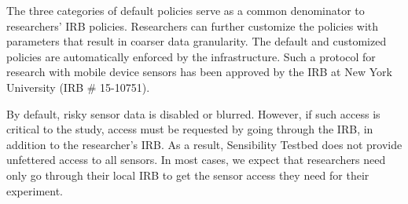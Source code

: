 The three categories of default policies serve as a common denominator 
to researchers' IRB policies. Researchers can further customize the policies 
with parameters that result in coarser data granularity. The default and 
customized policies are automatically enforced by the \sysname 
infrastructure. Such a 
protocol for research with mobile device sensors has been approved by
the IRB at New York University (IRB \# 15-10751). 

By default, risky sensor data is disabled or blurred. However, if such 
access is critical to the study, access must be requested by going through 
the \sysname IRB, in addition to the researcher's IRB. 
%
%
%
As a result, Sensibility Testbed does not
provide unfettered access to all sensors. 
In most cases, we expect
that researchers need only go through their local IRB to get
the sensor access they need for their experiment. 



